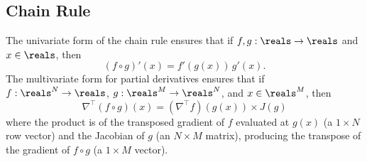 \documentclass[10pt]{article}
\begin{document}
\subsection{Chain Rule}

The univariate form of the chain rule ensures that if $f,g:\reals
\rightarrow \reals$ and $x \in \reals$, then 
\[
(f \circ g)'(x) = f'(g(x)) \, g'(x).
\]
The multivariate form for partial derivatives ensures that if
$f:\reals^N \rightarrow \reals$, $g:\reals^M \rightarrow \reals^N$,
and $x \in \reals^M$, then
\[
\nabla^{\top}\!(f \circ g) (x)
= 
  \left( \nabla^{\top} f \right)\!(g(x))
  \times
  J(g)
\]
where the product is of the transposed gradient of $f$ evaluated at
$g(x)$ (a $1 \times N$ row vector) and the Jacobian of $g$ (an $N
\times M$ matrix), producing the transpose of the gradient of $f \circ
g$ (a $1 \times M$ vector).



\clearpage
\nocite{Hogan:2014}
\nocite{Bell:2012}
\nocite{VandevoordeJosuttis:2002}
\nocite{Giles:2008}
\nocite{Gay:2005}
\nocite{GriewankWalther:2008}
\nocite{Fog:2014}
\nocite{Hogan:2014}
\nocite{Neal:2003}



\end{document}
